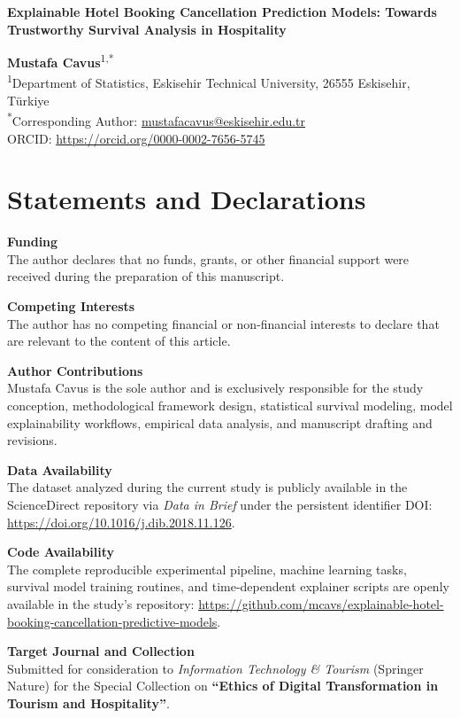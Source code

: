\documentclass[11pt,a4paper]{article}
\begin{document}
\begin{center}
    {\Large \textbf{Explainable Hotel Booking Cancellation Prediction Models: Towards Trustworthy Survival Analysis in Hospitality}}
    
    \vspace{1.5cm}
    
    \textbf{Mustafa Cavus}\textsuperscript{1,*}\\
    \vspace{0.2cm}
    \textsuperscript{1}Department of Statistics, Eskisehir Technical University, 26555 Eskisehir, T\"urkiye \\
    \vspace{0.3cm}
    \textsuperscript{*}Corresponding Author: \href{mailto:mustafacavus@eskisehir.edu.tr}{mustafacavus@eskisehir.edu.tr} \\
    ORCID: \url{https://orcid.org/0000-0002-7656-5745}
\end{center}

\vspace{1.5cm}

\section*{Statements and Declarations}

\textbf{Funding} \\
The author declares that no funds, grants, or other financial support were received during the preparation of this manuscript.

\textbf{Competing Interests} \\
The author has no competing financial or non-financial interests to declare that are relevant to the content of this article.

\textbf{Author Contributions} \\
Mustafa Cavus is the sole author and is exclusively responsible for the study conception, methodological framework design, statistical survival modeling, model explainability workflows, empirical data analysis, and manuscript drafting and revisions.

\textbf{Data Availability} \\
The dataset analyzed during the current study is publicly available in the ScienceDirect repository via \textit{Data in Brief} under the persistent identifier DOI: \url{https://doi.org/10.1016/j.dib.2018.11.126}.

\textbf{Code Availability} \\
The complete reproducible experimental pipeline, machine learning tasks, survival model training routines, and time-dependent explainer scripts are openly available in the study's repository: \href{https://github.com/mcavs/explainable-hotel-booking-cancellation-predictive-models}{https://github.com/mcavs/explainable-hotel-booking-cancellation-predictive-models}.

\textbf{Target Journal and Collection} \\
Submitted for consideration to \textit{Information Technology \& Tourism} (Springer Nature) for the Special Collection on \textbf{``Ethics of Digital Transformation in Tourism and Hospitality''}.
\end{document}
